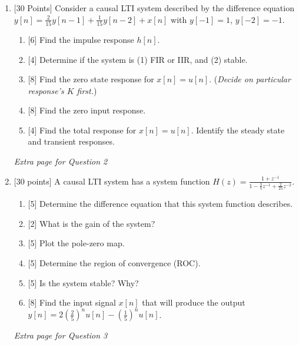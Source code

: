 \documentclass{article}
\begin{document}
\begin{enumerate}
    \vspace{1in}
    \item {[30 Points]} Consider a causal LTI system described by the difference equation $y[n] = \frac{2}{15}y[n-1]+\frac{1}{15}y[n-2]+x[n]$ with $y[-1] = 1$, $y[-2]=-1$.
    \begin{enumerate}
        \item {[6]} Find the impulse response $h[n]$.
        \item {[4]} Determine if the system is (1) FIR or IIR, and (2) stable.
        \item {[8]} Find the zero state response for $x[n] = u[n]$. ({\it Decide on particular response's $K$ first.})
        \item {[8]} Find the zero input response.
        \item {[4]} Find the total response for $x[n]=u[n]$. Identify the steady state and transient responses.
    \end{enumerate}
    \newpage
    \textit{Extra page for Question 2}
    \newpage
    \item {[30 points]} A causal LTI system has a system function $H(z) = \frac{1+z^{-1}}{1-\frac{3}{5}z^{-1}+\frac{2}{25}z^{-2}}.$
    \begin{enumerate}
        \item {[5]} Determine the difference equation that this system function describes.
        \item {[2]} What is the gain of the system?
        \item {[5]} Plot the pole-zero map.
        \item {[5]} Determine the region of convergence (ROC).
        \item {[5]} Is the system stable? Why?
        \item {[8]} Find the input signal $x[n]$ that will produce the output $y[n] = 2\left(\frac{2}{5}\right)^nu[n]-\left(\frac{1}{5}\right)^nu[n]$.
    \end{enumerate}
    
    \newpage
    \textit{Extra page for Question 3}
\end{enumerate}
\end{document}

